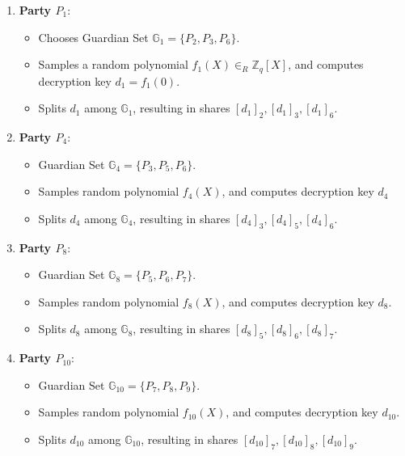 \documentclass{article}
\begin{document}
\begin{enumerate}
    \item \textbf{Party $P_1$}:
    \begin{itemize}
        \item Chooses Guardian Set $\mathbb{G}_1 = \{P_2, P_3, P_6\}$.
        \item Samples a random polynomial $f_1(X) \in_R \mathbb{Z}_q[X]$, and computes decryption key $d_1 = f_1(0)$.
        \item Splits $d_1$ among $\mathbb{G}_1$, resulting in shares $[d_1]_2, [d_1]_3, [d_1]_6$.
    \end{itemize}

    \item \textbf{Party $P_4$}:
    \begin{itemize}
        \item Guardian Set $\mathbb{G}_4 = \{P_3, P_5, P_6\}$.
        \item Samples random polynomial $f_4(X)$, and computes decryption key $d_4$
        \item Splits $d_4$ among $\mathbb{G}_4$, resulting in shares $[d_4]_3, [d_4]_5, [d_4]_6$.
    \end{itemize}

    \item \textbf{Party $P_8$}:
    \begin{itemize}
        \item Guardian Set $\mathbb{G}_8 = \{P_5, P_6, P_7\}$.
        \item Samples random polynomial $f_8(X)$, and computes decryption key $d_8$.
        \item Splits $d_8$ among $\mathbb{G}_8$, resulting in shares $[d_8]_5, [d_8]_6, [d_8]_7$.
    \end{itemize}

    \item \textbf{Party $P_{10}$}:
    \begin{itemize}
        \item Guardian Set $\mathbb{G}_{10} = \{P_7, P_8, P_9\}$.
        \item Samples random polynomial $f_{10}(X)$, and computes decryption key $d_{10}$.
        \item Splits $d_{10}$ among $\mathbb{G}_{10}$, resulting in shares $[d_{10}]_7, [d_{10}]_8, [d_{10}]_9$.
        
    \end{itemize}
\end{enumerate}
\end{document}
